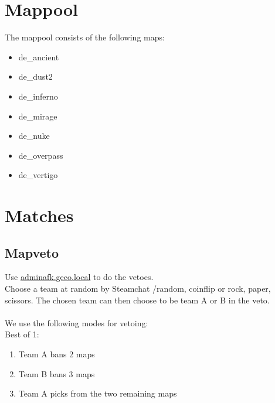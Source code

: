 \documentclass{article}
\begin{document}
\section{Mappool}
The mappool consists of the following maps:
\begin{itemize}
    \item de\_ancient
    \item de\_dust2
    \item de\_inferno
    \item de\_mirage
    \item de\_nuke
    \item de\_overpass
    \item de\_vertigo
\end{itemize}

\pagebreak
\section{Matches}


\subsection{Mapveto}
Use \href{http://adminafk.geco.local/pages/veto.php}{adminafk.geco.local} to do the vetoes.\\
Choose a team at random by Steamchat /random, coinflip or rock, paper, scissors. The chosen team can then choose to be team A or B in the veto.\\
\\
We use the following modes for vetoing:\\

Best of 1:
\begin{enumerate}
\item Team A bans 2 maps
\item Team B bans 3 maps
\item Team A picks from the two remaining maps
\end{enumerate}
\end{document}
